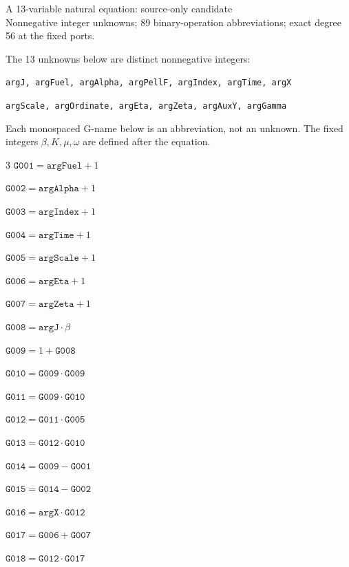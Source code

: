 \documentclass[10pt]{article}
\begin{document}
\begin{center}{\Large A 13-variable natural equation: source-only candidate}\\
Nonnegative integer unknowns; 89 binary-operation abbreviations; exact degree 56 at the fixed ports.
\end{center}
The 13 unknowns below are distinct nonnegative integers:
\par\small
\noindent\texttt{argJ, argFuel, argAlpha, argPellF, argIndex, argTime, argX}\par
\noindent\texttt{argScale, argOrdinate, argEta, argZeta, argAuxY, argGamma}\par
\normalsize
Each monospaced G-name below is an abbreviation, not an unknown. The fixed integers $\beta,K,\mu,\omega$ are defined after the equation.
\begin{multicols}{3}\small
\noindent $\mathtt{G001}=\mathtt{argFuel}+1$\par
\noindent $\mathtt{G002}=\mathtt{argAlpha}+1$\par
\noindent $\mathtt{G003}=\mathtt{argIndex}+1$\par
\noindent $\mathtt{G004}=\mathtt{argTime}+1$\par
\noindent $\mathtt{G005}=\mathtt{argScale}+1$\par
\noindent $\mathtt{G006}=\mathtt{argEta}+1$\par
\noindent $\mathtt{G007}=\mathtt{argZeta}+1$\par
\noindent $\mathtt{G008}=\mathtt{argJ}\cdot \beta$\par
\noindent $\mathtt{G009}=1+\mathtt{G008}$\par
\noindent $\mathtt{G010}=\mathtt{G009}\cdot \mathtt{G009}$\par
\noindent $\mathtt{G011}=\mathtt{G009}\cdot \mathtt{G010}$\par
\noindent $\mathtt{G012}=\mathtt{G011}\cdot \mathtt{G005}$\par
\noindent $\mathtt{G013}=\mathtt{G012}\cdot \mathtt{G010}$\par
\noindent $\mathtt{G014}=\mathtt{G009}-\mathtt{G001}$\par
\noindent $\mathtt{G015}=\mathtt{G014}-\mathtt{G002}$\par
\noindent $\mathtt{G016}=\mathtt{argX}\cdot \mathtt{G012}$\par
\noindent $\mathtt{G017}=\mathtt{G006}+\mathtt{G007}$\par
\noindent $\mathtt{G018}=\mathtt{G012}\cdot \mathtt{G017}$\par

\end{multicols}
\end{document}
